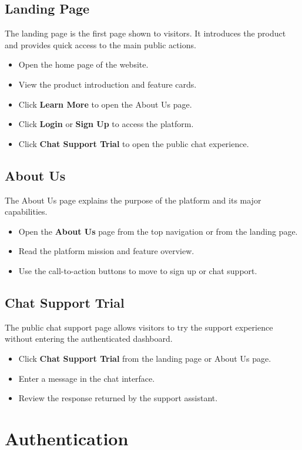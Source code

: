 \subsection{Landing Page}
The landing page is the first page shown to visitors. It introduces the product and provides quick access to the main public actions.
\begin{itemize}
    \item Open the home page of the website.
    \item View the product introduction and feature cards.
    \item Click \textbf{Learn More} to open the About Us page.
    \item Click \textbf{Login} or \textbf{Sign Up} to access the platform.
    \item Click \textbf{Chat Support Trial} to open the public chat experience.
\end{itemize}

\subsection{About Us}
The About Us page explains the purpose of the platform and its major capabilities.
\begin{itemize}
    \item Open the \textbf{About Us} page from the top navigation or from the landing page.
    \item Read the platform mission and feature overview.
    \item Use the call-to-action buttons to move to sign up or chat support.
\end{itemize}

\subsection{Chat Support Trial}
The public chat support page allows visitors to try the support experience without entering the authenticated dashboard.
\begin{itemize}
    \item Click \textbf{Chat Support Trial} from the landing page or About Us page.
    \item Enter a message in the chat interface.
    \item Review the response returned by the support assistant.
\end{itemize}

\section{Authentication}

